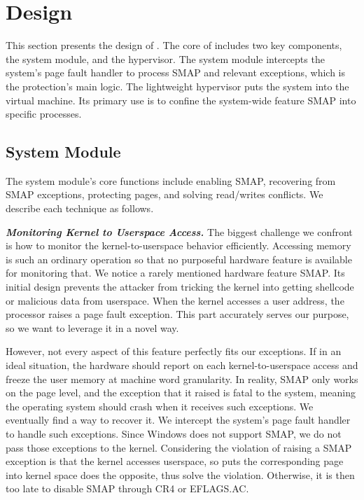 
\section{\name Design}
\label{sec:ktoctou-design}

This section presents the design of \name.  The core of \name includes two key components, the system module, and the hypervisor. The system module intercepts the system's page fault handler to process SMAP and relevant exceptions, which is the protection's main logic. The lightweight hypervisor puts the system into the virtual machine. Its primary use is to confine the system-wide feature SMAP into specific processes.

\subsection{System Module}

The system module's core functions include enabling SMAP, recovering from SMAP exceptions, protecting pages, and solving read/writes conflicts. We describe each technique as follows.


\textbf{\textit{Monitoring Kernel to Userspace Access. }} The biggest challenge we confront is how to monitor the kernel-to-userspace behavior efficiently. Accessing memory is such an ordinary operation so that no purposeful hardware feature is available for monitoring that.  We notice a rarely mentioned hardware feature SMAP. Its initial design prevents the attacker from tricking the kernel into getting shellcode or malicious data from userspace. When the kernel accesses a user address, the processor raises a page fault exception. This part accurately serves our purpose, so we want to leverage it in a novel way.

However, not every aspect of this feature perfectly fits our exceptions. If in an ideal situation, the hardware should report on each kernel-to-userspace access and freeze the user memory at machine word granularity. In reality, SMAP only works on the page level, and the exception that it raised is fatal to the system, meaning the operating system should crash when it receives such exceptions.  We eventually find a way to recover it. We intercept the system's page fault handler to handle such exceptions. Since Windows does not support SMAP, we do not pass those exceptions to the kernel. Considering the violation of raising a SMAP exception is that the kernel accesses userspace, so puts the corresponding page into kernel space does the opposite, thus solve the violation. Otherwise, it is then too late to disable SMAP through CR4 or EFLAGS.AC.


